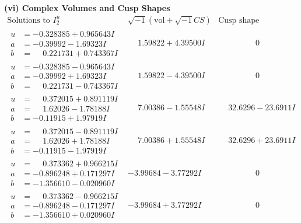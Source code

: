\documentclass[1p]{elsarticle_modified}
\theoremstyle{definition}
\newcommand{\I}{\sqrt{-1}}
\begin{document}
\newpage\flushleft \textbf{(vi) Complex Volumes and Cusp Shapes}
$$\begin{array}{c|c|c}  
\text{Solutions to }I^u_{2}& \I (\text{vol} + \sqrt{-1}CS) & \text{Cusp shape}\\
 \hline 
\begin{aligned}
u &= -0.328385 + 0.965643 I \\
a &= -0.39992 - 1.69323 I \\
b &= \phantom{-}0.221731 + 0.743367 I\end{aligned}
 & \phantom{-}1.59822 + 4.39500 I & \phantom{-0.000000 } 0 \\ \hline\begin{aligned}
u &= -0.328385 - 0.965643 I \\
a &= -0.39992 + 1.69323 I \\
b &= \phantom{-}0.221731 - 0.743367 I\end{aligned}
 & \phantom{-}1.59822 - 4.39500 I & \phantom{-0.000000 } 0 \\ \hline\begin{aligned}
u &= \phantom{-}0.372015 + 0.891119 I \\
a &= \phantom{-}1.62026 - 1.78188 I \\
b &= -0.11915 + 1.97919 I\end{aligned}
 & \phantom{-}7.00386 - 1.55548 I & \phantom{-}32.6296 - 23.6911 I \\ \hline\begin{aligned}
u &= \phantom{-}0.372015 - 0.891119 I \\
a &= \phantom{-}1.62026 + 1.78188 I \\
b &= -0.11915 - 1.97919 I\end{aligned}
 & \phantom{-}7.00386 + 1.55548 I & \phantom{-}32.6296 + 23.6911 I \\ \hline\begin{aligned}
u &= \phantom{-}0.373362 + 0.966215 I \\
a &= -0.896248 + 0.171297 I \\
b &= -1.356610 - 0.020960 I\end{aligned}
 & -3.99684 - 3.77292 I & \phantom{-0.000000 } 0 \\ \hline\begin{aligned}
u &= \phantom{-}0.373362 - 0.966215 I \\
a &= -0.896248 - 0.171297 I \\
b &= -1.356610 + 0.020960 I\end{aligned}
 & -3.99684 + 3.77292 I & \phantom{-0.000000 } 0 \\ \hline\begin{aligned}

\end{aligned}
\end{array}$$
\end{document}
